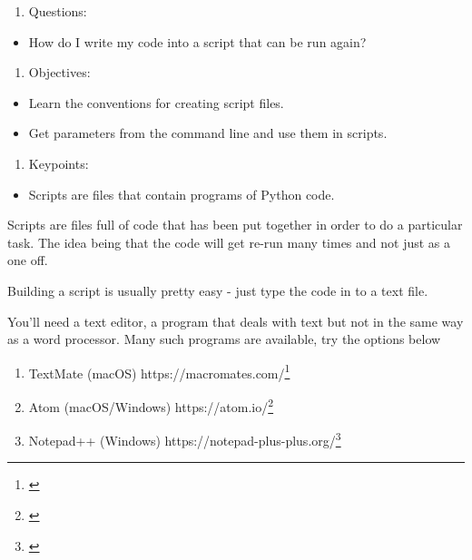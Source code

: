 \documentclass[]{book}
\providecommand{\tightlist}{%
  \setlength{\itemsep}{0pt}\setlength{\parskip}{0pt}}
\let\rmarkdownfootnote\footnote%
\def\footnote{\protect\rmarkdownfootnote}
\renewcommand{\href}[2]{#2\footnote{\url{#1}}}
\theoremstyle{definition}
\theoremstyle{definition}
\theoremstyle{definition}
\theoremstyle{remark}
\begin{document}
\begin{enumerate}
\def\labelenumi{\arabic{enumi}.}
\tightlist
\item
  Questions:
\end{enumerate}

\begin{itemize}
\tightlist
\item
  How do I write my code into a script that can be run again?
\end{itemize}

\begin{enumerate}
\def\labelenumi{\arabic{enumi}.}
\setcounter{enumi}{1}
\tightlist
\item
  Objectives:
\end{enumerate}

\begin{itemize}
\tightlist
\item
  Learn the conventions for creating script files.
\item
  Get parameters from the command line and use them in scripts.
\end{itemize}

\begin{enumerate}
\def\labelenumi{\arabic{enumi}.}
\setcounter{enumi}{2}
\tightlist
\item
  Keypoints:
\end{enumerate}

\begin{itemize}
\tightlist
\item
  Scripts are files that contain programs of Python code.
\end{itemize}

Scripts are files full of code that has been put together in order to do
a particular task. The idea being that the code will get re-run many
times and not just as a one off.

Building a script is usually pretty easy - just type the code in to a
text file.

You'll need a text editor, a program that deals with text but not in the
same way as a word processor. Many such programs are available, try the
options below

\begin{enumerate}
\def\labelenumi{\arabic{enumi}.}
\tightlist
\item
  TextMate (macOS) \href{}{https://macromates.com/}
\item
  Atom (macOS/Windows) \href{}{https://atom.io/}
\item
  Notepad++ (Windows) \href{}{https://notepad-plus-plus.org/}
\end{enumerate}
\end{document}
